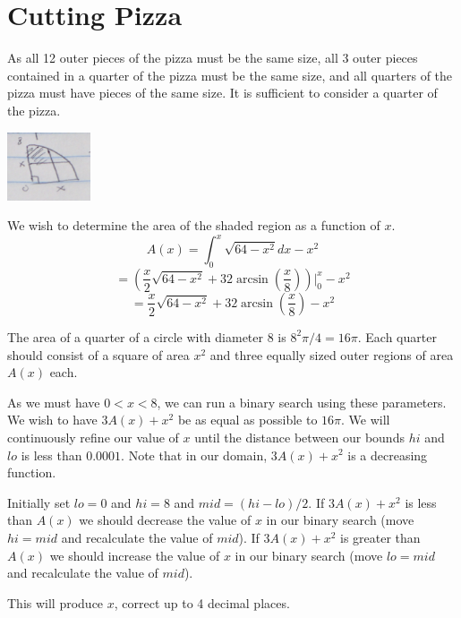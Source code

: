 \documentclass{article}
\begin{document}
\section{Cutting Pizza}
As all 12 outer pieces of the pizza must be the same size, all 3 outer pieces contained in a quarter of the pizza must be the same size, and all quarters of the pizza must have pieces of the same size. It is sufficient to consider a quarter of the pizza.
\par
\includegraphics{pizzadiagram}
\par
We wish to determine the area of the shaded region as a function of $x$.
\[A(x)=\int^x_0{\sqrt{64-x^2}dx}-x^2\]
\[=(\frac{x}{2}\sqrt{64-x^2}+32\arcsin(\frac{x}{8}))| ^x_0 -x^2\]
\[=\frac{x}{2}\sqrt{64-x^2}+32\arcsin(\frac{x}{8}) -x^2\]
\par 
The area of a quarter of a circle with diameter 8 is $8^2\pi/4=16\pi$. Each quarter should consist of a square of area $x^2$ and three equally sized outer regions of area $A(x)$ each.
\par 
As we must have $0 < x <8$, we can run a binary search using these parameters. We wish to have $3A(x)+x^2$ be as equal as possible to $16\pi$. We will continuously refine our value of $x$ until the distance between our bounds $hi$ and $lo$ is less than $0.0001$. Note that in our domain, $3A(x)+x^2$ is a decreasing function.
\par 
Initially set $lo=0$ and $hi=8$ and $mid=(hi-lo)/2$. If $3A(x)+x^2$ is less than $A(x)$ we should decrease the value of $x$ in our binary search (move $hi=mid$ and recalculate the value of $mid$).  If $3A(x)+x^2$ is greater than $A(x)$ we should increase the value of $x$ in our binary search (move $lo=mid$ and recalculate the value of $mid$). 
\par 
This will produce $x$, correct up to 4 decimal places.
\end{document}
